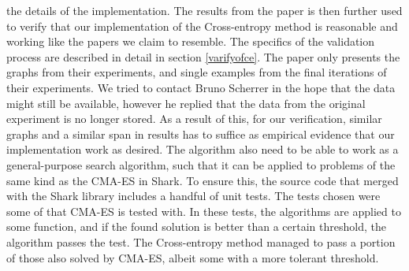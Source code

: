 the details of the implementation. The results from the paper is then further used
to verify that our implementation of the Cross-entropy method is reasonable and working 
like the papers we claim to resemble. The specifics of the validation process
are described in detail in section \ref{varifyofce}. The paper only presents the
graphs from their experiments, and single examples from the final iterations
of their experiments. We tried to contact Bruno Scherrer in the hope that 
the data might still be available, however he replied that the data from the
original experiment is no longer stored. As a result of this, for our verification,
similar graphs and a similar span in results has to suffice as 
empirical evidence that our implementation work as desired. 
The algorithm also need to be able to work as a general-purpose 
search algorithm, such that it can be applied to problems of the same kind as 
the CMA-ES in Shark. To ensure this, the source code that merged with the 
Shark library includes a handful of unit tests. The tests chosen were some
of that CMA-ES is tested with. In these tests, the algorithms are applied to some 
function, and if the found solution is better than a certain threshold, the 
algorithm passes the test. The Cross-entropy method managed to pass a portion 
of those also solved by CMA-ES, albeit some with a more tolerant threshold.



